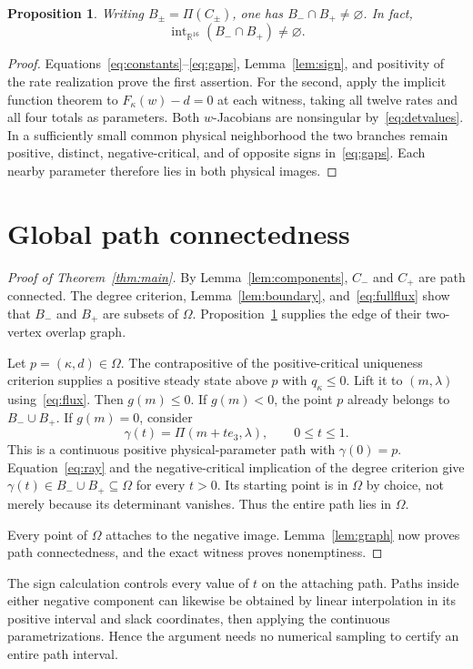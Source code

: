 \documentclass[11pt,a4paper]{article}
\numberwithin{equation}{section}
\newtheorem{proposition}[theorem]{Proposition}
\theoremstyle{remark}\newtheorem{remark}[theorem]{Remark}
\newcommand{\Om}{\Omega}
\DeclareMathOperator{\intt}{int}
\begin{document}
\begin{proposition}\label{prop:overlap}
Writing $B_\pm=\Pi(C_\pm)$, one has $B_-\cap B_+\ne\varnothing$. In fact,
\[
\intt_{\mathbb{R}^{16}}(B_-\cap B_+)\ne\varnothing.
\]
\end{proposition}
\begin{proof}
Equations~\eqref{eq:constants}--\eqref{eq:gaps}, Lemma~\ref{lem:sign}, and positivity of the rate realization prove the first assertion. For the second, apply the implicit function theorem to $F_\kappa(w)-d=0$ at each witness, taking all twelve rates and all four totals as parameters. Both $w$-Jacobians are nonsingular by~\eqref{eq:detvalues}. In a sufficiently small common physical neighborhood the two branches remain positive, distinct, negative-critical, and of opposite signs in~\eqref{eq:gaps}. Each nearby parameter therefore lies in both physical images.
\end{proof}

\section{Global path connectedness}\label{sec:global}
\begin{proof}[Proof of Theorem~\ref{thm:main}]
By Lemma~\ref{lem:components}, $C_-$ and $C_+$ are path connected. The degree criterion, Lemma~\ref{lem:boundary}, and~\eqref{eq:fullflux} show that $B_-$ and $B_+$ are subsets of $\Om$. Proposition~\ref{prop:overlap} supplies the edge of their two-vertex overlap graph.

Let $p=(\kappa,d)\in\Om$. The contrapositive of the positive-critical uniqueness criterion supplies a positive steady state above $p$ with $q_\kappa\leq0$. Lift it to $(m,\lambda)$ using~\eqref{eq:flux}. Then $g(m)\leq0$. If $g(m)<0$, the point $p$ already belongs to $B_-\cup B_+$. If $g(m)=0$, consider
\[
\gamma(t)=\Pi(m+te_3,\lambda),\qquad 0\leq t\leq1.
\]
This is a continuous positive physical-parameter path with $\gamma(0)=p$. Equation~\eqref{eq:ray} and the negative-critical implication of the degree criterion give $\gamma(t)\in B_-\cup B_+\subseteq\Om$ for every $t>0$. Its starting point is in $\Om$ by choice, not merely because its determinant vanishes. Thus the entire path lies in $\Om$.

Every point of $\Om$ attaches to the negative image. Lemma~\ref{lem:graph} now proves path connectedness, and the exact witness proves nonemptiness.
\end{proof}

The sign calculation controls every value of $t$ on the attaching path. Paths inside either negative component can likewise be obtained by linear interpolation in its positive interval and slack coordinates, then applying the continuous parametrizations. Hence the argument needs no numerical sampling to certify an entire path interval.
\end{document}

